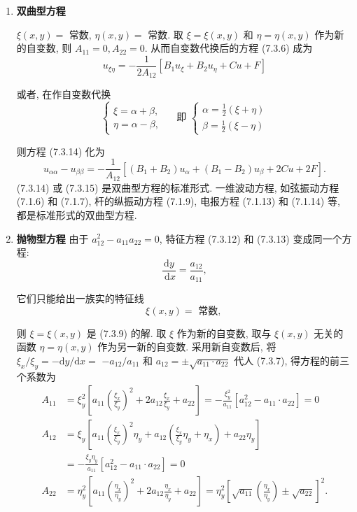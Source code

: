 \begin{enumerate}
    \item \textbf{双曲型方程}

$\xi(x, y)=$ 常数, $\eta(x, y)=$ 常数.
取 $\xi=\xi(x, y)$ 和 $\eta=\eta(x, y)$ 作为新的自变数, 则 $A_{11}=0, A_{22}=0$. 从而自变数代换后的方程 (7.3.6) 成为
$$
u_{\xi \eta}=-\frac{1}{2 A_{12}}\left[B_1 u_{\xi}+B_2 u_\eta+C u+F\right]
$$

或者, 在作自变数代换
$$
\left\{\begin{array} { l } 
{ \xi = \alpha + \beta , } \\
{ \eta = \alpha - \beta , }
\end{array} \quad \text { 即 } \left\{\begin{array}{l}
\alpha=\frac{1}{2}(\xi+\eta) \\
\beta=\frac{1}{2}(\xi-\eta)
\end{array}\right.\right.
$$

则方程 (7.3.14) 化为
$$
u_{\alpha \alpha}-u_{\beta \beta}=-\frac{1}{A_{12}}\left[\left(B_1+B_2\right) u_\alpha+\left(B_1-B_2\right) u_\beta+2 C u+2 F\right] .
$$
(7.3.14) 或 (7.3.15) 是双曲型方程的标准形式. 一维波动方程, 如弦振动方程 (7.1.6) 和 (7.1.7), 杆的纵振动方程 (7.1.9), 电报方程 (7.1.13) 和 (7.1.14) 等, 都是标准形式的双曲型方程.


\item \textbf{抛物型方程}
由于 $a_{12}^2-a_{11} a_{22}=0$, 特征方程 (7.3.12) 和 (7.3.13) 变成同一个方程:
$$
\frac{\mathrm{d} y}{\mathrm{~d} x}=\frac{a_{12}}{a_{11}},
$$

它们只能给出一族实的特征线
$$
\xi(x, y)=\text { 常数, }
$$

则 $\xi=\xi(x, y)$ 是 (7.3.9) 的解. 取 $\xi$ 作为新的自变数, 取与 $\xi(x, y)$ 无关的函数 $\eta=\eta(x, y)$ 作为另一新的自变数. 采用新自变数后, 将 $\xi_x / \xi_y=-\mathrm{d} y / \mathrm{d} x=$ $-a_{12} / a_{11}$ 和 $a_{12}= \pm \sqrt{a_{11} \cdot a_{22}}$ 代人 (7.3.7), 得方程的前三个系数为
$$
\begin{aligned}
A_{11} & =\xi_y^2\left[a_{11}\left(\frac{\xi_x}{\xi_y}\right)^2+2 a_{12} \frac{\xi_x}{\xi_y}+a_{22}\right]=-\frac{\xi_y^2}{a_{11}}\left[a_{12}^2-a_{11} \cdot a_{22}\right]=0 \\
A_{12} & =\xi_y\left[a_{11}\left(\frac{\xi_x}{\xi_y}\right)^2 \eta_y+a_{12}\left(\frac{\xi_x}{\xi_y} \eta_y+\eta_x\right)+a_{22} \eta_y\right] \\
& =-\frac{\xi_y \eta_y}{a_{11}}\left[a_{12}^2-a_{11} \cdot a_{22}\right]=0 \\
A_{22} & =\eta_y^2\left[a_{11}\left(\frac{\eta_x}{\eta_y}\right)^2+2 a_{12} \frac{\eta_x}{\eta_y}+a_{22}\right]=\eta_y^2\left[\sqrt{a_{11}}\left(\frac{\eta_x}{\eta_y}\right) \pm \sqrt{a_{22}}\right]^2 .
\end{aligned}
$$


\end{enumerate}
